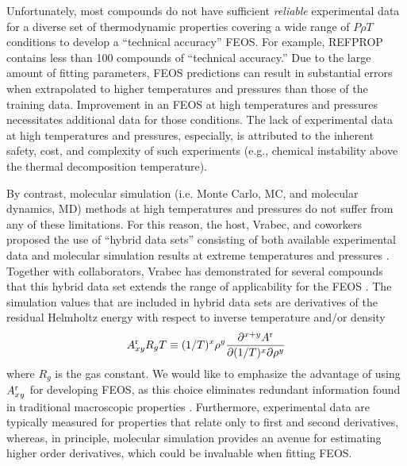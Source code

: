 \documentclass[12pt,a4paper]{article}
\begin{document}
Unfortunately, most compounds do not have sufficient \textit{reliable} experimental data for a diverse set of thermodynamic properties covering a wide range of $P \rho T$ conditions to develop a ``technical accuracy'' FEOS. For example, REFPROP contains less than 100 compounds of ``technical accuracy.'' Due to the large amount of fitting parameters, FEOS predictions can result in substantial errors when extrapolated to higher temperatures and pressures than those of the training data. Improvement in an FEOS at high temperatures and pressures necessitates additional data for those conditions. The lack of experimental data at high temperatures and pressures, especially, is attributed to the inherent safety, cost, and complexity of such experiments (e.g., chemical instability above the thermal decomposition temperature).

By contrast, molecular simulation (i.e. Monte Carlo, MC, and molecular dynamics, MD) methods at high temperatures and pressures do not suffer from any of these limitations. For this reason, the host, Vrabec, and coworkers proposed the use of ``hybrid data sets'' consisting of both available experimental data and molecular simulation results at extreme temperatures and pressures  . Together with collaborators, Vrabec has  demonstrated for several compounds that this hybrid data set extends the range of applicability for the FEOS \cite{Thol2016_siloxane_first,Thol2016_siloxane,Thol2017,Rutkai2013,Thol2015}. The simulation values that are included in hybrid data sets are derivatives of the residual Helmholtz energy with respect to inverse temperature and/or density
\begin{equation} \label{Residual Derivatives}
A_{xy}^{\rm r} R_gT \equiv (1/T)^x\rho^y \frac{\partial^{x+y}A^{\rm r}}{\partial(1/T)^x \partial \rho^y}
\end{equation}
where $R_g$ is the gas constant. We would like to emphasize the advantage of using $A_{xy}^{\rm r}$ for developing FEOS, as this choice eliminates redundant information found in traditional macroscopic properties \cite{Thol2016_LJ,Thol_LJTS,Rutkai2017,Lustig2015,Rutkai2013,Rutkai2015}. Furthermore, experimental data are typically measured for properties that relate only to first and second derivatives, whereas, in principle, molecular simulation provides an avenue for estimating higher order derivatives, which could be invaluable when fitting FEOS. 
\end{document}
